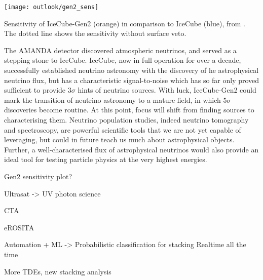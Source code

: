 \begin{marginfigure}
	\centering \texttt{[image: outlook/gen2\_sens]}
	\caption{Sensitivity of IceCube-Gen2 (orange) in comparison to IceCube (blue), from \cite{gen2_icrc}. The dotted line shows the sensitivity without surface veto.} 
	\label{fig:gen2_sens}
\end{marginfigure}

The AMANDA detector discovered atmospheric neutrinos, and served as a stepping stone to IceCube. IceCube, now in full operation for over a decade, successfully established neutrino astronomy with the discovery of he astrophysical neutrino flux, but has a characteristic signal-to-noise which has so far only proved sufficient to provide 3$\sigma$ hints of neutrino sources. With luck, IceCube-Gen2 could mark the transition of neutrino astronomy to a mature field, in which 5$\sigma$ discoveries become routine. At this point, focus will shift from finding sources to characterising them. Neutrino population studies, indeed neutrino tomography and spectroscopy, are powerful scientific tools that we are not yet capable of leveraging, but could in future teach us much about astrophysical objects. Further, a well-characterised flux of astrophysical neutrinos would also provide an ideal tool for testing particle physics at the very highest energies.

Gen2 sensitivity plot?

Ultrasat -> UV photon science

CTA

eROSITA

Automation + ML -> Probabilistic classification for stacking
Realtime all the time

More TDEs, new stacking analysis